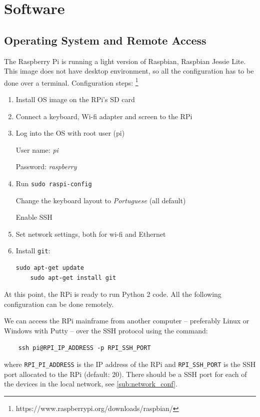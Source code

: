 \documentclass[twoside,a4paper]{refart}
\begin{document}
\section{Software}
\subsection{Operating System and Remote Access}
The Raspberry Pi is running a light version of Raspbian, Raspbian Jessie Lite\footnotemark. This image does not have desktop environment, so all the configuration has to be done over a terminal. Configuration steps:
\footnote{https://www.raspberrypi.org/downloads/raspbian/}
\begin{enumerate}
	\item Install OS image on the RPi's SD card
	\item Connect a keyboard, Wi-fi adapter and screen to the RPi
	\item Log into the OS with root user (pi)
	
	User name: \emph{pi}
	
	Password: \emph{raspberry}
	\item Run {\tt sudo raspi-config}
	
	Change the keyboard layout to \emph{Portuguese} (all default) 
	
	Enable SSH
	\item Set network settings, both for wi-fi and Ethernet
	\item Install {\tt git}:
	
	\begin{verbatim}sudo apt-get update
	sudo apt-get install git
	\end{verbatim}
	
\end{enumerate}
At this point, the RPi is ready to run Python 2 code. All the following configuration can be done remotely.

We can access the RPi mainframe from another computer -- preferably Linux or Windows with Putty -- over the SSH protocol using the command:

\begin{verbatim}
	ssh pi@RPI_IP_ADDRESS -p RPI_SSH_PORT
\end{verbatim}
where {\tt RPI\_PI\_ADDRESS} is the IP address of the RPi and {\tt RPI\_SSH\_PORT} is the SSH port allocated to the RPi (default: 20). There should be a SSH port for each of the devices in the local network, see \cref{sub:network_conf}.
\end{document}
